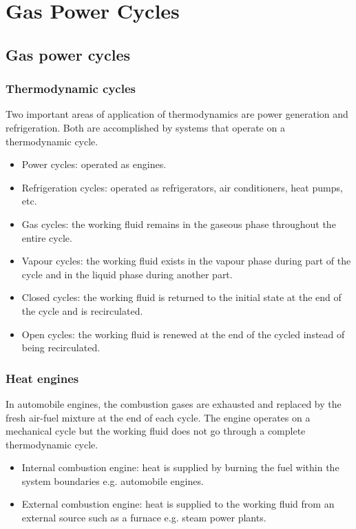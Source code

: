 \chapter{Gas Power Cycles}
\section{Gas power cycles}
\subsection{Thermodynamic cycles}
Two important areas of application of thermodynamics are power generation and refrigeration. Both are accomplished by systems that operate on a thermodynamic cycle.
\begin{itemize}[noitemsep]
  \item Power cycles: operated as engines.
  \item Refrigeration cycles: operated as refrigerators, air conditioners, heat pumps, etc.
  \item Gas cycles: the working fluid remains in the gaseous phase throughout the entire cycle.
  \item Vapour cycles: the working fluid exists in the vapour phase during part of the cycle and in the liquid phase during another part.
  \item Closed cycles: the working fluid is returned to the initial state at the end of the cycle and is recirculated.
  \item Open cycles: the working fluid is renewed at the end of the cycled instead of being recirculated.
\end{itemize}
\subsection{Heat engines}
In automobile engines, the combustion gases are exhausted and replaced by the fresh air-fuel mixture at the end of each cycle. The engine operates on a mechanical cycle but the working fluid does not go through a complete thermodynamic cycle.
\begin{itemize}[noitemsep]
  \item Internal combustion engine: heat is supplied by burning the fuel within the system boundaries e.g. automobile engines.
  \item External combustion engine: heat is supplied to the working fluid from an external source such as a furnace e.g. steam power plants.
\end{itemize}
